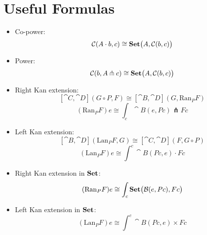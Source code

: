 \documentclass[DaoFP]{subfiles}
\begin{document}
\section{Useful Formulas}
\begin{itemize}
\item Co-power:
\[ \mathcal{C} (A \cdot b, c) \cong \mathbf{Set} \big( A, \mathcal{C} (b, c)\big) \]
\item Power:
\[ \mathcal{C} (b, A \pitchfork c) \cong \mathbf{Set}  \big(A, \mathcal{C}(b, c)\big) \]
\item Right Kan extension:
\[ [\cat C, \cat D](G \circ P, F) \cong [\cat B, \cat D](G, \text{Ran}_P F) \]
 \[ (\text{Ran}_P F) e \cong \int_c \cat B (e, P c) \pitchfork F c \]
\item Left Kan extension:
\[ [\cat B, \cat D](\text{Lan}_P F , G) \cong  [\cat C, \cat D] (F, G \circ P) \]
\[ (\text{Lan}_P F) e \cong \int^{c} \cat B(P c, e) \cdot F c \]
\item Right Kan extension in $\mathbf{Set}$:
  \[ (\text{Ran}_P F) e \cong \int_c \mathbf{Set} \big( \mathcal{B} (e, P c), F c\big) \]
\item Left Kan extension in $\mathbf{Set}$:
\[ (\text{Lan}_P F) e \cong \int^{c} \cat B (P c, e) \times F c \]


\end{itemize}
\end{document}
